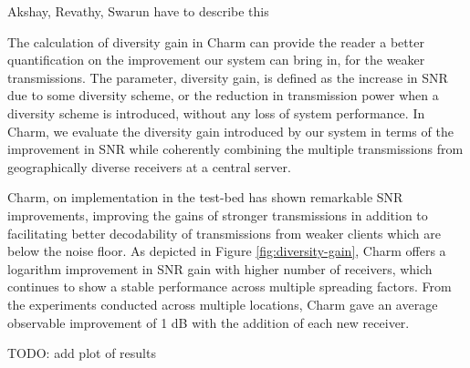 {\color{blue} Akshay, Revathy, Swarun have to describe this

{\color{violet}
The calculation of diversity gain in Charm can provide the reader a better quantification on the improvement our system can bring in, for the weaker transmissions. The parameter, diversity gain, is defined as the increase in SNR due to some diversity scheme, or the reduction in transmission power when a diversity scheme is introduced, without any loss of system performance. In Charm, we evaluate the diversity gain introduced by our system in terms of the improvement in SNR while coherently combining the multiple transmissions from geographically diverse receivers at a central server.

Charm, on implementation in the test-bed has shown remarkable SNR improvements, improving the gains of stronger transmissions in addition to facilitating better decodability of transmissions from weaker clients which are below the noise floor. As depicted in Figure \ref{fig:diversity-gain}, Charm offers a logarithm improvement in SNR gain with higher number of receivers, which continues to show a stable performance across multiple spreading factors. From the experiments conducted across multiple locations, Charm gave an average observable improvement of 1 dB with the addition of each new receiver.


}

TODO: add plot of results}


